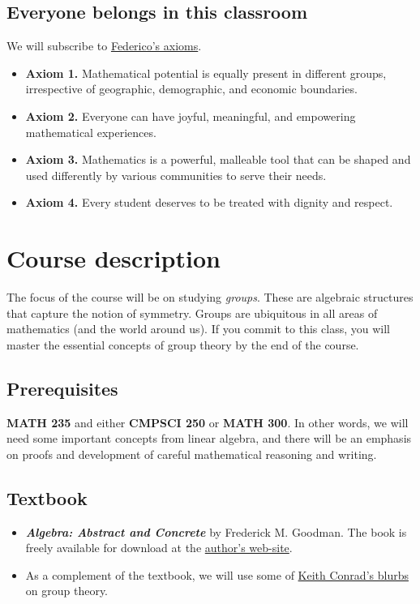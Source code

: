 \documentclass[11pt]{article}
\begin{document}
\subsection{Everyone belongs in this classroom}
\label{sec:orgc43060b}
We will subscribe to \href{https://www.ams.org/publications/journals/notices/201610/rnoti-p1164.pdf}{Federico's axioms}.

\begin{itemize}
\item \textbf{Axiom 1.} Mathematical potential is equally present in different groups,
irrespective of geographic, demographic, and economic boundaries.

\item \textbf{Axiom 2.} Everyone can have joyful, meaningful, and empowering mathematical
experiences.

\item \textbf{Axiom 3.} Mathematics is a powerful, malleable tool that can be shaped and
used differently by various communities to serve their needs.

\item \textbf{Axiom 4.} Every student deserves to be treated with dignity and respect.
\end{itemize}

\section{Course description}
\label{sec:org60393f2}
The focus of the course will be on studying \emph{groups}. These are algebraic
structures that capture the notion of symmetry. Groups are ubiquitous in all
areas of mathematics (and the world around us). If you commit to this class,
you will master the essential concepts of group theory by the end of the
course.
\subsection{Prerequisites}
\label{sec:orgee9b4ad}
\textbf{MATH 235} and either \textbf{CMPSCI 250} or \textbf{MATH 300}. In other words, we will need some
important concepts from linear algebra, and there will be an emphasis on proofs
and development of careful mathematical reasoning and writing.

\subsection{Textbook}
\label{sec:orgb516002}
\begin{itemize}
\item \textbf{\emph{Algebra: Abstract and Concrete}} by Frederick M. Goodman. The book is
freely available for download at the \href{https://homepage.divms.uiowa.edu/\~goodman/algebrabook.dir/algebrabook.html}{author's web-site}.
\item As a complement of the textbook, we will use some of \href{https://kconrad.math.uconn.edu/blurbs/}{Keith Conrad's blurbs} on
group theory.
\end{itemize}
\end{document}
